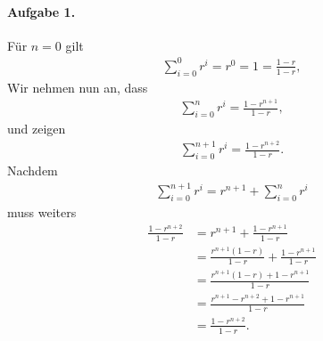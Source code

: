 \documentclass{article}
\begin{document}
\paragraph{Aufgabe 1.} Für $n = 0$ gilt
\begin{align*}
    \sum_{i = 0}^{0}r^i = r^0 = 1 = \frac{1 - r}{1 - r},
\end{align*}
Wir nehmen nun an, dass
\begin{align*}
    \sum_{i = 0}^n r^i = \frac{1 - r^{n + 1}}{1 - r},
\end{align*}
und zeigen
\begin{align*}
    \sum_{i = 0}^{n + 1} r^i = \frac{1 - r^{n + 2}}{1 - r}.
\end{align*}
Nachdem
\begin{align*}
    \sum_{i = 0}^{n + 1} r^i = r^{n + 1} + \sum_{i = 0}^{n} r^i
\end{align*}
muss weiters
\begin{align*}
    \frac{1 - r^{n + 2}}{1 - r} &= r^{n + 1} + \frac{1 - r^{n + 1}}{1 - r} \\
    &= \frac{r^{n + 1}(1 - r)}{1 - r} + \frac{1 - r^{n + 1}}{1 - r} \\
    &= \frac{r^{n + 1}(1 - r) + 1 - r^{n + 1}}{1 - r} \\
    &= \frac{r^{n + 1} - r^{n + 2} + 1 - r^{n + 1}}{1 - r} \\
    &= \frac{1 - r^{n + 2}}{1 - r}.
\end{align*}
\end{document}
